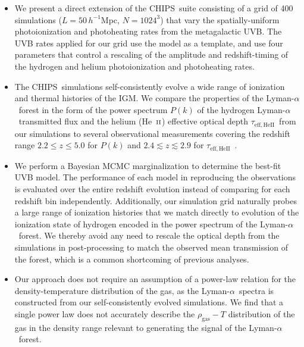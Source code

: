 \documentclass[twocolumn]{aastex62}
\newcommand\Lya{Lyman-$\alpha$}
\newcommand\Sim{CHIPS~}
\def\HeII{\hbox{He~$\scriptstyle\rm II$}}
\newcommand\taueffHe{$\tau_{\mathrm{eff,HeII}}$~}
\begin{document}
\begin{itemize}

\item We present a direct extension of the \Sim suite \citep{villasenor2021a} consisting of a grid of 400 simulations 
($L=50\,h^{-1}$Mpc, $N=1024^3$) that vary the spatially-uniform photoionization and photoheating rates from 
the metagalactic UVB.  The UVB rates applied for our grid use the \cite{puchwein2019a} model as a template, and
use four parameters that control a rescaling of the amplitude and redshift-timing of the hydrogen and helium
photoionization and photoheating rates.

\item The \Sim simulations self-consistently evolve a wide range of ionization and thermal histories of the IGM. 
We compare the properties of the \Lya\ forest in the form of the power spectrum $P(k)$ of the hydrogen \Lya\ transmitted 
flux and the helium (\HeII) effective optical depth \taueffHe from our simulations to several observational measurements covering 
the redshift range $2.2 \leq z \leq 5.0$ for $P(k)$ \citep{Irsic+2017a, boera2019a, Chabanier+2019} and $2.4 \lesssim z \lesssim 2.9$ for  \taueffHe  \citep{worseck2016a}.    

\item We perform a Bayesian MCMC marginalization to determine the best-fit UVB model. The performance of each  model in reproducing the
observations is evaluated over the entire redshift evolution instead of comparing for each redshift bin independently. Additionally, 
our simulation grid naturally probes a large range of ionization histories that we match directly to evolution of the ionization 
state of hydrogen encoded in the power spectrum of the \Lya\ forest. We thereby avoid any need to rescale the optical depth from the 
simulations in post-processing to match the observed mean transmission of the forest, which is a common shortcoming of previous 
analyses.

\item Our approach does not require an assumption of a power-law relation for the density-temperature distribution of the gas, as the \Lya\ spectra
is constructed from our self-consistently evolved simulations. We
find that a single power law does not accurately describe the $\rho_\mathrm{gas}-T$ 
distribution of the gas in the density range relevant to generating the signal of the \Lya\ forest. 


\end{itemize}
\end{document}
